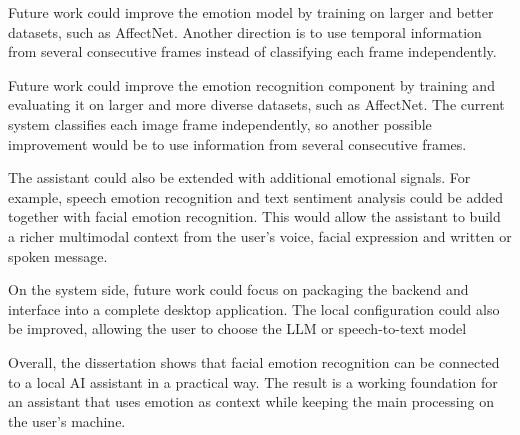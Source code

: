 Future work could improve the emotion model by training on larger and better datasets, such as AffectNet. Another direction is to use temporal information from several consecutive frames instead of classifying each frame independently.

Future work could improve the emotion recognition component by training and evaluating it on larger and more diverse datasets, such as AffectNet. The current system classifies each image frame independently, so another possible improvement would be to use information from several consecutive frames.

The assistant could also be extended with additional emotional signals. For example, speech emotion recognition and text sentiment analysis could be added together with facial emotion recognition. This would allow the assistant to build a richer multimodal context from the user's voice, facial expression and written or spoken message.

On the system side, future work could focus on packaging the backend and interface into a complete desktop application. The local configuration could also be improved, allowing the user to choose the LLM or speech-to-text model

Overall, the dissertation shows that facial emotion recognition can be connected to a local AI assistant in a practical way. The result is a working foundation for an assistant that uses emotion as context while keeping the main processing on the user's machine.